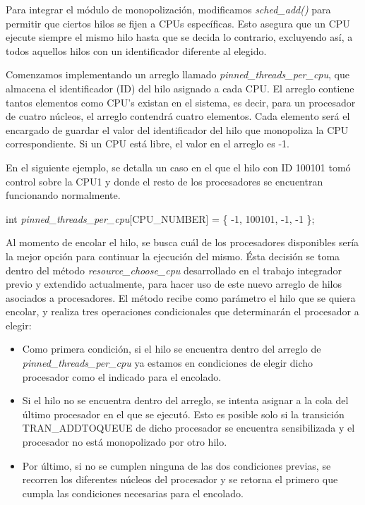 Para integrar el módulo de monopolización, modificamos \textit{sched\_add()} para permitir que ciertos hilos se fijen a CPUs específicas. Esto asegura que un CPU ejecute siempre el mismo hilo hasta que se decida lo contrario, excluyendo así, a todos aquellos hilos con un identificador diferente al elegido.

Comenzamos implementando un arreglo llamado \textit{pinned\_threads\_per\_cpu}, que almacena el identificador (ID) del hilo asignado a cada CPU. El arreglo contiene tantos elementos como CPU's existan en el sistema, es decir, para un procesador de cuatro núcleos, el arreglo contendrá cuatro elementos. Cada elemento será el encargado de guardar el valor del identificador del hilo que monopoliza la CPU correspondiente.  Si un CPU está libre, el valor en el arreglo es -1.

En el siguiente ejemplo, se detalla un caso en el que el hilo con ID 100101 tomó control sobre la CPU1 y donde el resto de los procesadores se encuentran funcionando normalmente.

int \textit{pinned\_threads\_per\_cpu}[CPU\_NUMBER] = \{ -1, 100101, -1, -1 \};

Al momento de encolar el hilo, se busca cuál de los procesadores disponibles sería la mejor opción para continuar la ejecución del mismo. Ésta decisión se toma dentro del método \textit{resource\_choose\_cpu} desarrollado en el trabajo integrador previo y extendido actualmente, para hacer uso de este nuevo arreglo de hilos asociados a procesadores. El método recibe como parámetro el hilo que se quiera encolar, y realiza tres operaciones condicionales que determinarán el procesador a elegir:

\begin{itemize}
    \item Como primera condición, si el hilo se encuentra dentro del arreglo de \textit{pinned\_threads\_per\_cpu} ya estamos en condiciones de elegir dicho procesador como el indicado para el encolado.
    \item Si el hilo no se encuentra dentro del arreglo, se intenta asignar a la cola del último procesador en el que se ejecutó. Esto es posible solo si la transición TRAN\_ADDTOQUEUE de dicho procesador se encuentra sensibilizada y el procesador no está monopolizado por otro hilo.
    \item Por último, si no se cumplen ninguna de las dos condiciones previas, se recorren los diferentes núcleos del procesador y se retorna el primero que cumpla las condiciones necesarias para el encolado.
\end{itemize}

